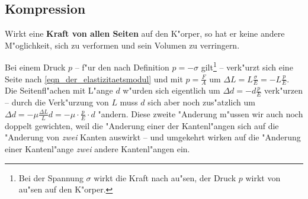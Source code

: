 \subsection{Kompression}
\label{kap_kompression}


Wirkt eine \textbf{Kraft von allen Seiten} auf den K"orper, so hat er
keine andere M"oglichkeit, sich zu verformen und sein Volumen zu
verringern. 

Bei einem Druck $p$ -- f"ur den nach Definition $p = - \sigma$
gilt\footnote{Bei der Spannung $\sigma$ wirkt die Kraft nach au"sen,
  der Druck $p$ wirkt von au"sen auf den K"orper.} -- verk"urzt sich
eine Seite nach \eqref{eqn_der_elastizitaetsmodul} und mit $p =
\frac{F}{A}$ um $\Delta L = L \frac{\sigma}{E} = - L \frac{p}{E}$. Die
Seitenfl"achen mit L"ange $d$ w"urden sich eigentlich um $\Delta d = -
d \frac{p}{E}$ verk"urzen -- durch die Verk"urzung von $L$ muss $d$
sich aber noch zus"atzlich um $\Delta d = - \mu \frac{ \Delta L
  }{L} d = - \mu \cdot \frac{p}{E} \cdot d$ "andern. Diese zweite
"Anderung m"ussen wir auch noch doppelt gewichten, %
weil die "Anderung einer der Kantenl"angen sich auf die "Anderung von
\emph{zwei} Kanten auswirkt -- und umgekehrt wirken auf die "Anderung
einer Kantenl"ange \emph{zwei} andere Kantenl"angen ein.

